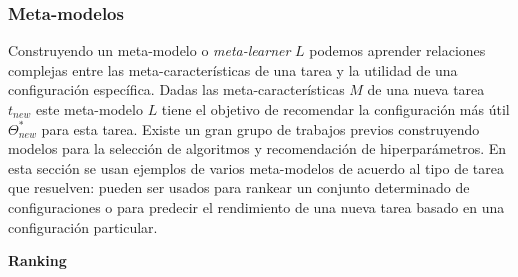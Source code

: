 \subsubsection{Meta-modelos}


Construyendo un meta-modelo o \textit{meta-learner} $L$ podemos aprender relaciones complejas entre las meta-características de una tarea y la utilidad de una configuración específica. Dadas las meta-características $M$ de una nueva tarea $t_{new}$ este meta-modelo $L$ tiene el objetivo de recomendar la configuración más útil $\Theta_{new}^*$ para esta tarea. Existe un gran grupo de trabajos previos construyendo modelos para la selección de algoritmos y recomendación de hiperparámetros. En esta sección se usan ejemplos de varios meta-modelos de acuerdo al tipo de tarea que resuelven: pueden ser usados para rankear un conjunto determinado de configuraciones o para predecir el rendimiento de una nueva tarea basado en una configuración particular. %

\quad

\textbf{Ranking}



